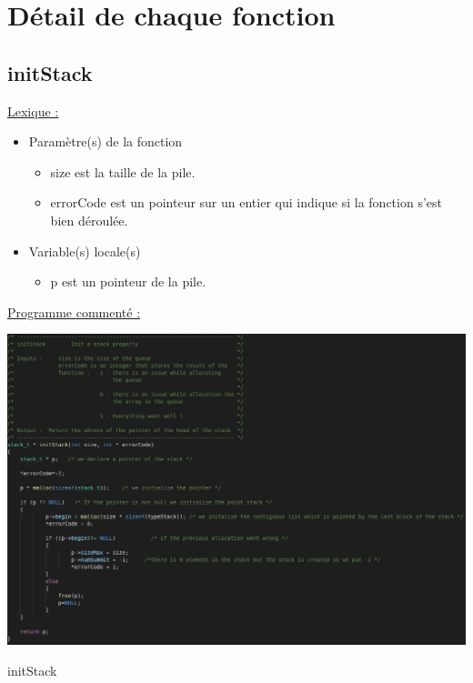 \documentclass[a4paper]{article}
\begin{document}
\section{Détail de chaque fonction}

\subsection{initStack}
\underline{Lexique :}

\begin{itemize}

\item Paramètre(s) de la fonction  

\begin{itemize}

\item size est la taille de la pile.

\item errorCode est un pointeur sur un entier qui indique si la fonction s'est bien déroulée.

\end{itemize}

\item Variable(s) locale(s)

\begin{itemize}

\item p est un pointeur de la pile.
\end{itemize}

\end{itemize}

\underline{Programme commenté :}
\begin{center}
\includegraphics[scale=0.4]{initStack.png}

initStack
\end{center}
\end{document}
